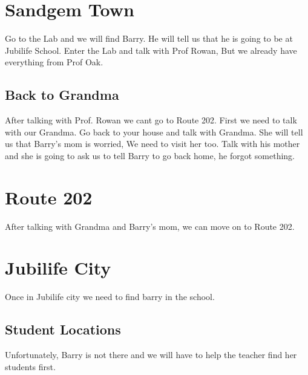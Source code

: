 \documentclass[11pt]{article}
\begin{document}
\section{Sandgem Town}\label{sec:sandgem-town}
Go to the Lab and we will find Barry. He will tell us that he is going to be at Jubilife School.
Enter the Lab and talk with Prof Rowan, But we already have everything from Prof Oak.

\subsection{Back to Grandma}\label{subsec:back-to-grandma}
After talking with Prof. Rowan we cant go to Route 202.
First we need to talk with our Grandma.
Go back to your house and talk with Grandma.
She will tell us that Barry's mom is worried, We need to visit her too.
Talk with his mother and she is going to ask us to tell Barry to go back home, he forgot something.

\section{Route 202}\label{sec:Route_202}

After talking with Grandma and Barry's mom, we can move on to Route 202.



\section{Jubilife City}\label{sec:jubilife-city}
Once in Jubilife city we need to find barry in the school.

\subsection{Student Locations}\label{subsec:student-locations}
Unfortunately, Barry is not there and we will have to help the teacher find her students first.
\end{document}
